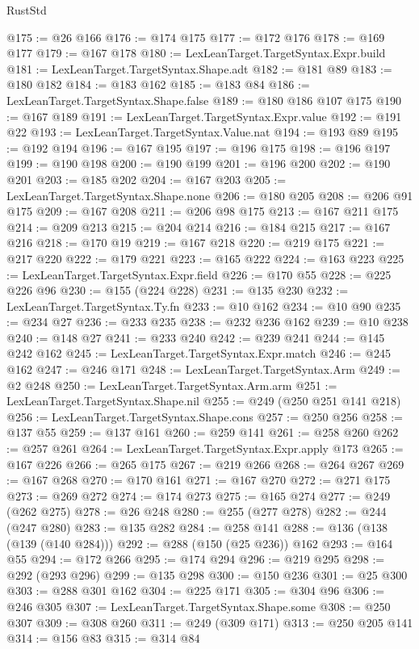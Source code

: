 \begin{lexlean}{RustStd}
\begin{coremodule}
@175 := @26 @166
@176 := @174 @175
@177 := @172 @176
@178 := @169 @177
@179 := @167 @178
@180 := LexLeanTarget.TargetSyntax.Expr.build
@181 := LexLeanTarget.TargetSyntax.Shape.adt
@182 := @181 @89
@183 := @180 @182
@184 := @183 @162
@185 := @183 @84
@186 := LexLeanTarget.TargetSyntax.Shape.false
@189 := @180 @186 @107 @175
@190 := @167 @189
@191 := LexLeanTarget.TargetSyntax.Expr.value
@192 := @191 @22
@193 := LexLeanTarget.TargetSyntax.Value.nat
@194 := @193 @89
@195 := @192 @194
@196 := @167 @195
@197 := @196 @175
@198 := @196 @197
@199 := @190 @198
@200 := @190 @199
@201 := @196 @200
@202 := @190 @201
@203 := @185 @202
@204 := @167 @203
@205 := LexLeanTarget.TargetSyntax.Shape.none
@206 := @180 @205
@208 := @206 @91 @175
@209 := @167 @208
@211 := @206 @98 @175
@213 := @167 @211 @175
@214 := @209 @213
@215 := @204 @214
@216 := @184 @215
@217 := @167 @216
@218 := @170 @19
@219 := @167 @218
@220 := @219 @175
@221 := @217 @220
@222 := @179 @221
@223 := @165 @222
@224 := @163 @223
@225 := LexLeanTarget.TargetSyntax.Expr.field
@226 := @170 @55
@228 := @225 @226 @96
@230 := @155 (@224 @228)
@231 := @135 @230
@232 := LexLeanTarget.TargetSyntax.Ty.fn
@233 := @10 @162
@234 := @10 @90
@235 := @234 @27
@236 := @233 @235
@238 := @232 @236 @162
@239 := @10 @238
@240 := @148 @27
@241 := @233 @240
@242 := @239 @241
@244 := @145 @242 @162
@245 := LexLeanTarget.TargetSyntax.Expr.match
@246 := @245 @162
@247 := @246 @171
@248 := LexLeanTarget.TargetSyntax.Arm
@249 := @2 @248
@250 := LexLeanTarget.TargetSyntax.Arm.arm
@251 := LexLeanTarget.TargetSyntax.Shape.nil
@255 := @249 (@250 @251 @141 @218)
@256 := LexLeanTarget.TargetSyntax.Shape.cons
@257 := @250 @256
@258 := @137 @55
@259 := @137 @161
@260 := @259 @141
@261 := @258 @260
@262 := @257 @261
@264 := LexLeanTarget.TargetSyntax.Expr.apply @173
@265 := @167 @226
@266 := @265 @175
@267 := @219 @266
@268 := @264 @267
@269 := @167 @268
@270 := @170 @161
@271 := @167 @270
@272 := @271 @175
@273 := @269 @272
@274 := @174 @273
@275 := @165 @274
@277 := @249 (@262 @275)
@278 := @26 @248
@280 := @255 (@277 @278)
@282 := @244 (@247 @280)
@283 := @135 @282
@284 := @258 @141
@288 := @136 (@138 (@139 (@140 @284)))
@292 := @288 (@150 (@25 @236)) @162
@293 := @164 @55
@294 := @172 @266
@295 := @174 @294
@296 := @219 @295
@298 := @292 (@293 @296)
@299 := @135 @298
@300 := @150 @236
@301 := @25 @300
@303 := @288 @301 @162
@304 := @225 @171
@305 := @304 @96
@306 := @246 @305
@307 := LexLeanTarget.TargetSyntax.Shape.some
@308 := @250 @307
@309 := @308 @260
@311 := @249 (@309 @171)
@313 := @250 @205 @141
@314 := @156 @83
@315 := @314 @84

\end{coremodule}
\end{lexlean}
